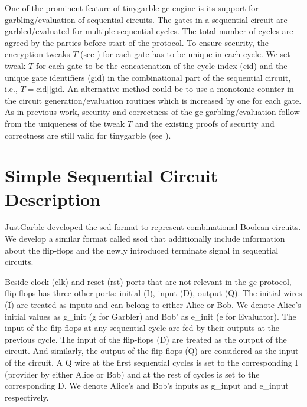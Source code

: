 One of the prominent feature of \gls{tinygarble} \acrshort{gc} engine is its support for garbling/evaluation of sequential circuits.
The gates in a sequential circuit are garbled/evaluated for multiple sequential cycles.
The total number of cycles are agreed by the parties before start of the protocol.
To ensure security, the encryption tweaks $T$ (see ) for each gate has to be unique in each cycle\cite[Sect. 3.4]{henecka2013faster}.
We set tweak $T$ for each gate to be the concatenation of the cycle index (cid) and the unique gate identifiers (gid) in the combinational part of the sequential circuit, i.e., $T = \textrm{cid} || \textrm{gid}$.
An alternative method could be to use a monotonic counter in the circuit generation/evaluation routines which is increased by one for each gate.
As in previous work, security and correctness of the \acrshort{gc} garbling/evaluation follow from the uniqueness of the tweak $T$ and the existing proofs of security and correctness are still valid for \gls{tinygarble} (see \cite{lindell2009proof, bellare2013efficient, zahur2015two}).


\section{Simple Sequential Circuit Description}\label{sec:engine-sscd}
JustGarble \cite{bellare2013efficient} developed the \acrfull{scd} format to represent combinational Boolean circuits.
We develop a similar format called \acrfull{sscd} that additionally include information about the flip-flops and the newly introduced terminate signal in sequential circuits.

Beside clock (clk) and reset (rst) ports that are not relevant in the \acrshort{gc} protocol, flip-flops has three other ports: initial (I), input (D), output (Q).
The initial wires (I) are treated as inputs and can belong to either Alice or Bob.
We denote Alice's initial values as g\_init (g for Garbler) and Bob' as e\_init (e for Evaluator).
The input of the flip-flops at any sequential cycle are fed by their outputs at the previous cycle.
The input of the flip-flops (D) are treated  as the output of the circuit.
And similarly, the output of the flip-flops (Q) are considered as the input of the circuit.
A Q wire at the first sequential cycles is set to the corresponding I (provider by either Alice or Bob) and at the rest of cycles is set to the corresponding D.
We denote Alice's and Bob's inputs as g\_input and e\_input respectively.

